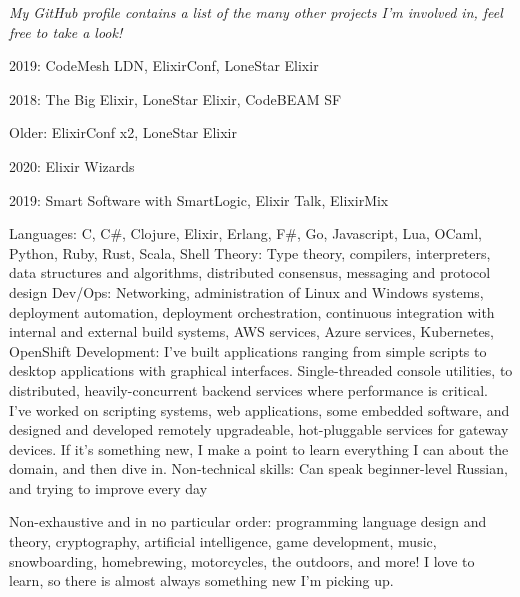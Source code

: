 \documentclass[10pt,a4paper]{article}
\begin{document}
\vspace{-0.2em}
\begin{center}
  \emph{\small My GitHub profile contains a list of the many other projects I'm involved in, feel free to take a look!}
\end{center}

\spacedhrule{-0.2em}{-0.4em}


\inlineheadsection
  {2019:}
  {CodeMesh LDN, ElixirConf, LoneStar Elixir}
  
\inlineheadsection
  {2018:}
  {The Big Elixir, LoneStar Elixir, CodeBEAM SF}
  
\inlineheadsection
  {Older:}
  {ElixirConf x2, LoneStar Elixir}
  
  

\inlineheadsection
  {2020:}
  {Elixir Wizards}
  
  
\inlineheadsection
  {2019:}
  {Smart Software with SmartLogic, Elixir Talk, ElixirMix}




\inlineheadsection  %
  {Languages:}
  {C, C\#, Clojure, Elixir, Erlang, F\#, Go, Javascript, Lua, OCaml, Python, Ruby, Rust, Scala, Shell}
\inlineheadsection
  {Theory:}
  {Type theory, compilers, interpreters, data structures and algorithms, distributed consensus, messaging and protocol design}
\inlineheadsection
  {Dev/Ops:}
  {Networking, administration of Linux and Windows systems, deployment automation, deployment orchestration, continuous integration with internal and external build systems, AWS services, Azure services, Kubernetes, OpenShift}
\inlineheadsection
  {Development:}
  {I've built applications ranging from simple scripts to desktop applications with graphical interfaces. Single-threaded console utilities, to distributed, heavily-concurrent backend services where performance is critical. I've worked on scripting systems, web applications, some embedded software, and designed and developed remotely upgradeable, hot-pluggable services for gateway devices. If it's something new, I make a point to learn everything I can about the domain, and then dive in.}
\inlineheadsection
  {Non-technical skills:}
  {Can speak beginner-level Russian, and trying to improve every day}


\inlineheadsection
  {Non-exhaustive and in no particular order:}
  {programming language design and theory, cryptography, artificial intelligence, game development, music, snowboarding, homebrewing, motorcycles, the outdoors, and more! I love to learn, so there is almost always something new I'm picking up.}
\end{document}
